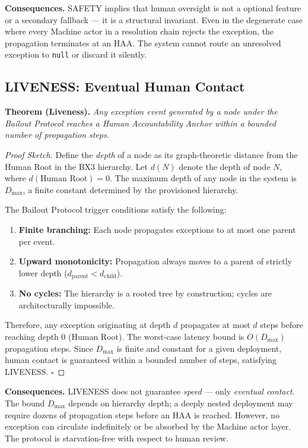 \textbf{Consequences.} SAFETY implies that human oversight is not a optional feature or a secondary fallback — it is a structural invariant. Even in the degenerate case where every Machine actor in a resolution chain rejects the exception, the propagation terminates at an HAA. The system cannot route an unresolved exception to \texttt{null} or discard it silently.

\subsection{LIVENESS: Eventual Human Contact}

\textbf{Theorem (Liveness).} \emph{Any exception event generated by a node under the Bailout Protocol reaches a Human Accountability Anchor within a bounded number of propagation steps.}

\begin{proof}[Proof Sketch]
Define the \emph{depth} of a node as its graph-theoretic distance from the Human Root in the BX3 hierarchy. Let $d(N)$ denote the depth of node $N$, where $d(\text{Human Root}) = 0$. The maximum depth of any node in the system is $D_{\max}$, a finite constant determined by the provisioned hierarchy.

The Bailout Protocol trigger conditions satisfy the following:
\begin{enumerate}
    \item \textbf{Finite branching:} Each node propagates exceptions to at most one parent per event.
    \item \textbf{Upward monotonicity:} Propagation always moves to a parent of strictly lower depth ($d_{\text{parent}} < d_{\text{child}}$).
    \item \textbf{No cycles:} The hierarchy is a rooted tree by construction; cycles are architecturally impossible.
\end{enumerate}

Therefore, any exception originating at depth $d$ propagates at most $d$ steps before reaching depth $0$ (Human Root). The worst-case latency bound is $O(D_{\max})$ propagation steps. Since $D_{\max}$ is finite and constant for a given deployment, human contact is guaranteed within a bounded number of steps, satisfying LIVENESS. \hfill $\square$
\end{proof}

\textbf{Consequences.} LIVENESS does not guarantee \emph{speed} — only \emph{eventual contact}. The bound $D_{\max}$ depends on hierarchy depth; a deeply nested deployment may require dozens of propagation steps before an HAA is reached. However, no exception can circulate indefinitely or be absorbed by the Machine actor layer. The protocol is starvation-free with respect to human review.

